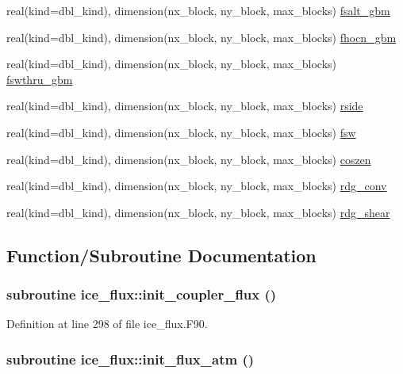 \begin{DoxyCompactItemize}
\item 
real(kind=dbl\_\-kind), dimension(nx\_\-block, ny\_\-block, max\_\-blocks) \hyperlink{namespaceice__flux_ac48af307927403704bd7ad20cb0d54b3}{fsalt\_\-gbm}
\item 
real(kind=dbl\_\-kind), dimension(nx\_\-block, ny\_\-block, max\_\-blocks) \hyperlink{namespaceice__flux_a0262e88be5633673703d664fdb6e5123}{fhocn\_\-gbm}
\item 
real(kind=dbl\_\-kind), dimension(nx\_\-block, ny\_\-block, max\_\-blocks) \hyperlink{namespaceice__flux_ac9af65dc6cf70d6aed3b1eafc170c7a4}{fswthru\_\-gbm}
\item 
real(kind=dbl\_\-kind), dimension(nx\_\-block, ny\_\-block, max\_\-blocks) \hyperlink{namespaceice__flux_aaea76ee9c1cbdc7807e6de1b05378957}{rside}
\item 
real(kind=dbl\_\-kind), dimension(nx\_\-block, ny\_\-block, max\_\-blocks) \hyperlink{namespaceice__flux_acc02310f399ca37f700f432975393813}{fsw}
\item 
real(kind=dbl\_\-kind), dimension(nx\_\-block, ny\_\-block, max\_\-blocks) \hyperlink{namespaceice__flux_af909ebcaf2c2e92389a7dfce1e42f5c7}{coszen}
\item 
real(kind=dbl\_\-kind), dimension(nx\_\-block, ny\_\-block, max\_\-blocks) \hyperlink{namespaceice__flux_aff0f1042e74134275ef6e30a2719c03f}{rdg\_\-conv}
\item 
real(kind=dbl\_\-kind), dimension(nx\_\-block, ny\_\-block, max\_\-blocks) \hyperlink{namespaceice__flux_a4b3e399d9f8de85996ef9292690e425e}{rdg\_\-shear}
\end{DoxyCompactItemize}


\subsection{Function/Subroutine Documentation}
\hypertarget{namespaceice__flux_ac74f9f7368cb2f65428e77204441ef67}{
\subsubsection[{init\_\-coupler\_\-flux}]{\setlength{\rightskip}{0pt plus 5cm}subroutine ice\_\-flux::init\_\-coupler\_\-flux ()}}
\label{namespaceice__flux_ac74f9f7368cb2f65428e77204441ef67}


Definition at line 298 of file ice\_\-flux.F90.\hypertarget{namespaceice__flux_aa03a1e25e4227bda9639c5a178891acd}{
\subsubsection[{init\_\-flux\_\-atm}]{\setlength{\rightskip}{0pt plus 5cm}subroutine ice\_\-flux::init\_\-flux\_\-atm ()}}
\label{namespaceice__flux_aa03a1e25e4227bda9639c5a178891acd}



